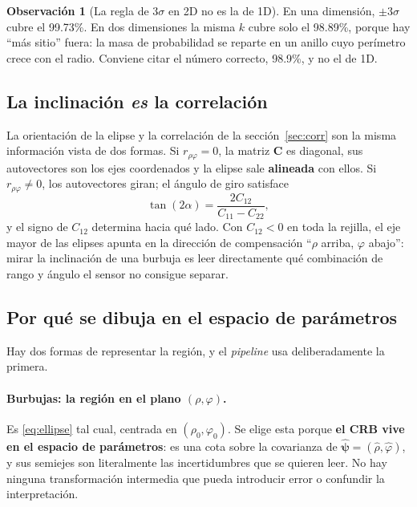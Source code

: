 \documentclass[11pt,a4paper]{article}
\newcommand{\vect}[1]{\boldsymbol{#1}}
\newcommand{\matr}[1]{\mathbf{#1}}
\theoremstyle{definition}
\newtheorem{obs}{Observación}
\theoremstyle{plain}
\begin{document}
\begin{obs}[La regla de $3\sigma$ en 2D no es la de 1D]
En una dimensión, $\pm3\sigma$ cubre el 99.73\%. En dos dimensiones la
misma $k$ cubre solo el 98.89\%, porque hay \enquote{más sitio} fuera: la
masa de probabilidad se reparte en un anillo cuyo perímetro crece con el radio.
Conviene citar el número correcto, 98.9\%, y no el de 1D.
\end{obs}

\subsection{La inclinación \emph{es} la correlación}

La orientación de la elipse y la correlación de la sección~\ref{sec:corr} son la
misma información vista de dos formas. Si $r_{\rho\varphi}=0$, la matriz
$\matr C$ es diagonal, sus autovectores son los ejes coordenados y la elipse
sale \textbf{alineada} con ellos. Si $r_{\rho\varphi}\ne0$, los autovectores
giran; el ángulo de giro satisface
%
\begin{equation}
\label{eq:tilt}
\tan(2\alpha) = \frac{2C_{12}}{C_{11}-C_{22}} ,
\end{equation}
%
y el signo de $C_{12}$ determina hacia qué lado. Con $C_{12}<0$ en toda la
rejilla, el eje mayor de las elipses apunta en la dirección de compensación
\enquote{$\rho$ arriba, $\varphi$ abajo}: mirar la inclinación de una burbuja es
leer directamente qué combinación de rango y ángulo el sensor no consigue
separar.

\subsection{Por qué se dibuja en el espacio de parámetros}

Hay dos formas de representar la región, y el \emph{pipeline} usa
deliberadamente la primera.

\paragraph{Burbujas: la región en el plano $(\rho,\varphi)$.}
Es \eqref{eq:ellipse} tal cual, centrada en $(\rho_0,\varphi_0)$. Se elige esta
porque \textbf{el CRB vive en el espacio de parámetros}: es una cota sobre la
covarianza de $\hat{\vect\psi}=(\hat\rho,\hat\varphi)$, y sus semiejes son
literalmente las incertidumbres que se quieren leer. No hay ninguna
transformación intermedia que pueda introducir error o confundir la
interpretación.
\end{document}

